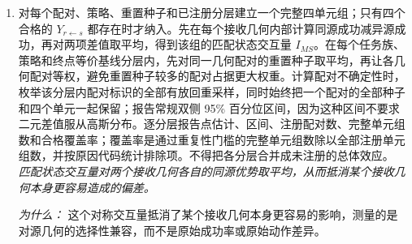 \documentclass[10pt,a4paper]{article}
\begin{document}
\begin{enumerate}[leftmargin=*,start=4]
\noindent\emph{\(Y_{r\leftarrow s}\) 表示把源几何 s 产生的动作块放入接收几何 r 执行，并从真实动作后观测继续闭环后是否完成原生任务。}
\par{}
\par\emph{为什么：} 在每个接收几何内部，交叉单元只改变第一个动作块来自哪个源。使用真实动作后观测继续执行，可以避开重放前缀和旧 cache 造成的伪差异。
  \item 对每个配对、策略、重置种子和已注册分层建立一个完整四单元组；只有四个合格的 \(Y_{r\leftarrow s}\) 都存在时才纳入。先在每个接收几何内部计算同源成功减异源成功，再对两项差值取平均，得到该组的匹配状态交互量 \(I_{MS}\)。在每个任务族、策略和终点等价基线分层内，先对同一几何配对的重置种子取平均，再让各几何配对等权，避免重置种子较多的配对占据更大权重。计算配对不确定性时，枚举该分层内配对标识的全部有放回重采样，同时始终把一个配对的全部种子和四个单元一起保留；报告常规双侧 95\% 百分位区间，因为这种区间不要求二元差值服从高斯分布。逐分层报告点估计、区间、注册配对数、完整单元组数和合格覆盖率；覆盖率是通过重复性门槛的完整单元组数除以全部注册单元组数，并按原因代码统计排除项。不得把各分层合并成未注册的总体效应。
\noindent\emph{匹配状态交互量对两个接收几何各自的同源优势取平均，从而抵消某个接收几何本身更容易造成的偏差。}
\par{}
\par\emph{为什么：} 这个对称交互量抵消了某个接收几何本身更容易的影响，测量的是对源几何的选择性兼容，而不是原始成功率或原始动作差异。
\end{enumerate}
\end{document}
